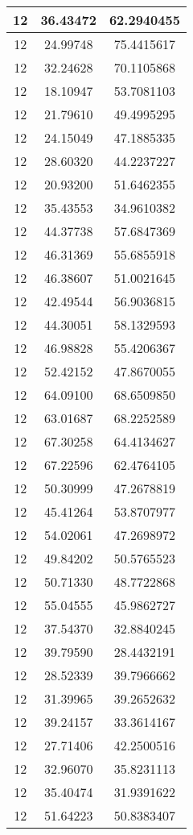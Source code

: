 \documentclass[
]{book}
\begin{document}
\begin{tabular}{c|c|c}
\hline
12 & 36.43472 & 62.2940455\\
\hline
12 & 24.99748 & 75.4415617\\
\hline
12 & 32.24628 & 70.1105868\\
\hline
12 & 18.10947 & 53.7081103\\
\hline
12 & 21.79610 & 49.4995295\\
\hline
12 & 24.15049 & 47.1885335\\
\hline
12 & 28.60320 & 44.2237227\\
\hline
12 & 20.93200 & 51.6462355\\
\hline
12 & 35.43553 & 34.9610382\\
\hline
12 & 44.37738 & 57.6847369\\
\hline
12 & 46.31369 & 55.6855918\\
\hline
12 & 46.38607 & 51.0021645\\
\hline
12 & 42.49544 & 56.9036815\\
\hline
12 & 44.30051 & 58.1329593\\
\hline
12 & 46.98828 & 55.4206367\\
\hline
12 & 52.42152 & 47.8670055\\
\hline
12 & 64.09100 & 68.6509850\\
\hline
12 & 63.01687 & 68.2252589\\
\hline
12 & 67.30258 & 64.4134627\\
\hline
12 & 67.22596 & 62.4764105\\
\hline
12 & 50.30999 & 47.2678819\\
\hline
12 & 45.41264 & 53.8707977\\
\hline
12 & 54.02061 & 47.2698972\\
\hline
12 & 49.84202 & 50.5765523\\
\hline
12 & 50.71330 & 48.7722868\\
\hline
12 & 55.04555 & 45.9862727\\
\hline
12 & 37.54370 & 32.8840245\\
\hline
12 & 39.79590 & 28.4432191\\
\hline
12 & 28.52339 & 39.7966662\\
\hline
12 & 31.39965 & 39.2652632\\
\hline
12 & 39.24157 & 33.3614167\\
\hline
12 & 27.71406 & 42.2500516\\
\hline
12 & 32.96070 & 35.8231113\\
\hline
12 & 35.40474 & 31.9391622\\
\hline
12 & 51.64223 & 50.8383407\\

\end{tabular}
\end{document}
